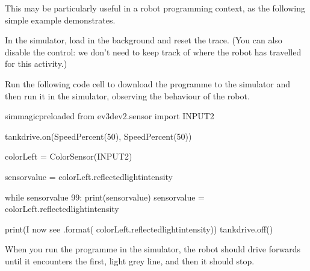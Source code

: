 \documentclass[letterpaper,10pt,english]{sphinxmanual}
\begin{document}
This may be particularly useful in a robot programming context, as the following simple example demonstrates.

In the simulator, load in the  background and reset the trace. (You can also disable the  control: we don’t need to keep track of where the robot has travelled for this activity.)

Run the following code cell to download the programme to the simulator and then run it in the simulator, observing the behaviour of the robot.

{
\begin{sphinxVerbatim}[commandchars=\\\{\}]
\llap{\color{nbsphinxin}[ ]:\,\hspace{\fboxrule}\hspace{\fboxsep}}\PYGZpc{}\PYGZpc{}sim\PYGZus{}magic\PYGZus{}preloaded
from ev3dev2.sensor import INPUT\PYGZus{}2

tank\PYGZus{}drive.on(SpeedPercent(50), SpeedPercent(50))

colorLeft = ColorSensor(INPUT\PYGZus{}2)

sensor\PYGZus{}value = colorLeft.reflected\PYGZus{}light\PYGZus{}intensity

while sensor\PYGZus{}value \PYGZgt{} 99:
    print(sensor\PYGZus{}value)
    sensor\PYGZus{}value = colorLeft.reflected\PYGZus{}light\PYGZus{}intensity

print(\PYGZdq{}I now see \PYGZob{}\PYGZcb{}\PYGZdq{}.format( colorLeft.reflected\PYGZus{}light\PYGZus{}intensity))
tank\PYGZus{}drive.off()
\end{sphinxVerbatim}
}

When you run the programme in the simulator, the robot should drive forwards until it encounters the first, light grey line, and then it should stop.

\end{document}
